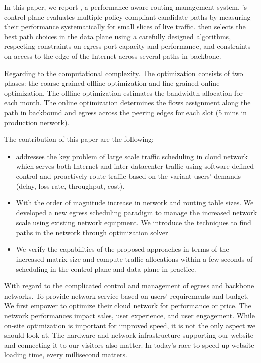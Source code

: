 In this paper, we report {\sys}, a performance-aware routing management system. {\sys}’s control plane evaluates multiple policy-compliant candidate paths by measuring their performance systematically for small slices of live traffic. {\sys} then selects the best path choices in the data plane using a carefully designed algorithms, respecting constraints on egress port capacity and performance, and constraints on access to the edge of the Internet across several paths in backbone. 


Regarding to the computational complexity. The optimization consists of two phases: the coarse-grained offline optimization and fine-grained online optimization. The offline optimization estimates the bandwidth allocation for each month. The online optimization determines the flows assignment along the path in backbound and egress across the peering edges for each slot (5 mins in production network).

The contribution of this paper are the following: 
\begin{itemize}[leftmargin=*] 
    \item {\sys} addresses the key problem of large scale traffic scheduling in cloud network which serves both Internet and inter-datacenter traffic using software-defined control and proactively route traffic based on the variant users' demands (delay, loss rate, throughput, cost). 
    \item  With the order of magnitude increase in network and routing table sizes. We developed a new egress scheduling paradigm to manage the increased network scale using existing network equipment. We introduce the techniques to find paths in the network through optimization solver
    \item  We verify the capabilities of the proposed approaches in terms of the increased matrix size and compute traffic allocations within a few seconds of scheduling in the control plane and data plane in practice.
\end{itemize}

With regard to the complicated control and management of egress and backbone networks. To provide network service based on users' requirements and budget. We first empower to optimize their cloud network for performance or price. 
The network performances impact sales, user experience, and user engagement. While on-site optimization is important for improved speed, it is not the only aspect we should look at. The hardware and network infrastructure supporting our website and connecting it to our visitors also matter. In today’s race to speed up website loading time, every millisecond matters. 


